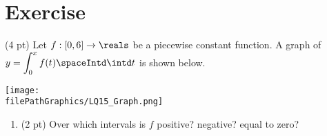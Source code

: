 %
%
%
%

\section{Exercise}


(4 pt) Let $f : [0,6] \rightarrow \reals$ be a piecewise constant function. A graph of $y = \displaystyle\int_{0}^{x} f(t) \spaceIntd \intd t$ is shown below.
\begin{center}
\texttt{[image: \\filePathGraphics/LQ15\_Graph.png]}
\end{center}

\begin{enumerate}[label=(\alph*)]
\item\label{itm : LQ15a} (2 pt) Over which intervals is $f$ positive? negative? equal to zero?
\end{enumerate}

